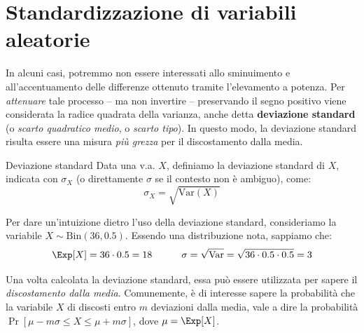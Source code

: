\documentclass[a4paper, 12pt]{report}
\begin{document}
    \section{Standardizzazione di variabili aleatorie}
    \label{standard}

    In alcuni casi, potremmo non essere interessati allo sminuimento e all'accentuamento delle differenze ottenuto tramite l'elevamento a potenza. Per \textit{attenuare} tale processo -- ma non invertire -- preservando il segno positivo viene considerata la radice quadrata della varianza, anche detta \textbf{deviazione standard} (o \textit{scarto quadratico medio}, o \textit{scarto tipo}). In questo modo, la deviazione standard risulta essere una misura \textit{più grezza} per il discostamento dalla media.

    \begin{frameddefn}{Deviazione standard}
        Data una v.a. $X$, definiamo la deviazione standard di $X$, indicata con $\sigma_X$ (o direttamente $\sigma$ se il contesto non è ambiguo), come:
        \[\sigma_X = \sqrt{\mathrm{Var}(X)}\]
    \end{frameddefn}
    
    Per dare un'intuizione dietro l'uso della deviazione standard, consideriamo la variabile $X \sim \mathrm{Bin}(36, 0.5)$. Essendo una distribuzione nota, sappiamo che:
    \[\Exp[X] = 36 \cdot 0.5 = 18 \qquad\quad \sigma = \sqrt{\mathrm{Var}} = \sqrt{36 \cdot 0.5 \cdot 0.5} = 3\]

    Una volta calcolata la deviazione standard, essa può essere utilizzata per sapere il \textit{discostamento dalla media}. Comunemente, è di interesse sapere la probabilità che la variabile $X$ di discosti entro $m$ deviazioni dalla media, vale a dire la probabilità $\Pr[\mu - m\sigma \leq X \leq \mu + m\sigma]$, dove $\mu = \Exp[X]$.
\end{document}
